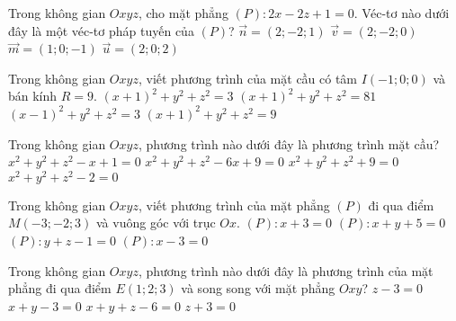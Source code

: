 \begin{ex}%
	Trong không gian $ Oxyz $, cho mặt phẳng $ (P) \colon 2x-2z+1=0 $. Véc-tơ nào dưới đây là một véc-tơ pháp tuyến của $ (P) $?
	\choice
	{$ \overrightarrow{n}=(2;-2;1) $}
	{$ \overrightarrow{v}=(2;-2;0) $}
	{\True $ \overrightarrow{m}=(1;0;-1) $}
	{$ \overrightarrow{u}=(2;0;2) $}
\end{ex}
\begin{ex}%
	Trong không gian $ Oxyz $, viết phương trình của mặt cầu có tâm $ I(-1;0;0) $ và bán kính $ R=9 $.
	\choice
	{$ (x+1)^2 +y^2+z^2=3$}
	{\True $ (x+1)^2 +y^2+z^2=81$}
	{$ (x-1)^2 +y^2+z^2=3$}
	{$ (x+1)^2 +y^2+z^2=9$}
\end{ex}
\begin{ex}%
	Trong không gian $ Oxyz $, phương trình nào dưới đây là phương trình mặt cầu?
	\choice
	{$ x^2+y^2+z^2-x+1=0 $}
	{$ x^2+y^2+z^2-6x+9=0 $}
	{$ x^2+y^2+z^2+9=0 $}
	{\True $ x^2+y^2+z^2-2=0 $}
\end{ex}
\begin{ex}%
	Trong không gian $ Oxyz $, viết phương trình của mặt phẳng $ (P) $ đi qua điểm $ M(-3;-2;3) $ và vuông góc với trục $ Ox $.
	\choice
	{\True $ (P) \colon x+3=0 $}
	{$ (P) \colon x+y+5=0 $}
	{$ (P) \colon y+z-1=0$}
	{$ (P) \colon x-3=0$}
\end{ex}
\begin{ex}%
	Trong không gian $ Oxyz $, 	phương trình nào dưới đây là phương trình của mặt phẳng đi qua điểm $ E(1;2;3) $ và song song với mặt phẳng $ Oxy $?
	\choice
	{\True $ z-3=0 $}
	{$ x+y-3=0 $}
	{$ x+y+z-6=0 $}
	{$ z+3=0 $}
\end{ex}

